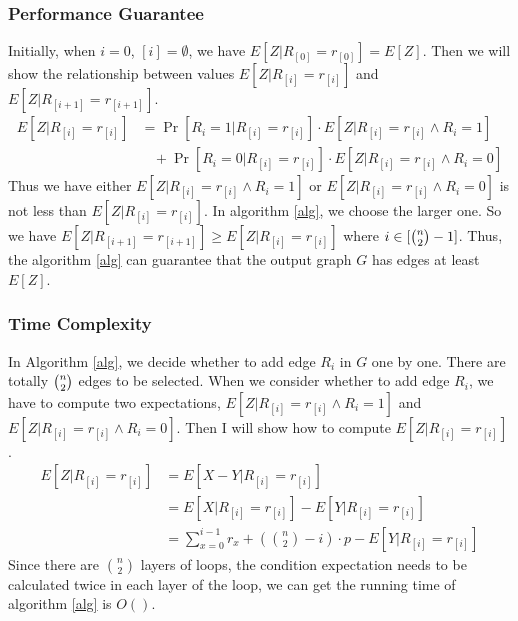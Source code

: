 \subsubsection{Performance Guarantee}

Initially, when $i=0$, $[i]=\emptyset$, we have $E[Z|R_{[0]}=r_{[0]}]=E[Z]$.
Then we will show the relationship between values $E[Z|R_{[i]}=r_{[i]}]$ and  $E[Z|R_{[i+1]}=r_{[i+1]}]$. 
\begin{align}
    \nonumber E[Z|R_{[i]}=r_{[i]}]&=\Pr[R_i=1|R_{[i]}=r_{[i]}]\cdot E[Z|R_{[i]}=r_{[i]}\wedge R_i=1]\\
    \nonumber &~~~~+\Pr[R_i=0|R_{[i]}=r_{[i]}]\cdot E[Z|R_{[i]}=r_{[i]}\wedge R_i=0]
\end{align}
Thus we have either $E[Z|R_{[i]}=r_{[i]}\wedge R_i=1]$ or $E[Z|R_{[i]}=r_{[i]}\wedge R_i=0]$ is not less than  $E[Z|R_{[i]}=r_{[i]}] $. In algorithm \ref{alg}, we choose the larger one. So we have $E[Z|R_{[i+1]}=r_{[i+1]}] \ge E[Z|R_{[i]}=r_{[i]}]$ where $i\in [\tbinom{n}{2}-1]$.
Thus, the algorithm \ref{alg} can guarantee that the output graph $G$ has edges at least $E[Z]$.
\subsubsection{Time Complexity }
In Algorithm \ref{alg}, we decide whether to add edge $R_i$ in $G$ one by one. There are totally $\tbinom{n}{2}$ edges to be selected.
When we consider whether to add edge $R_i$, we have to compute two expectations, $E[Z|R_{[i]}=r_{[i]}\wedge R_i=1]$ and $E[Z|R_{[i]}=r_{[i]}\wedge R_i=0]$. Then I will show how to compute $E[Z|R_{[i]}=r_{[i]}]$.
\begin{align}
    \nonumber E[Z|R_{[i]}=r_{[i]}]&=E[X-Y|R_{[i]}=r_{[i]}]\\
    \nonumber &=E[X|R_{[i]}=r_{[i]}]-E[Y|R_{[i]}=r_{[i]}]\\
    \nonumber &=\sum_{x=0}^{i-1}r_x + (\binom{n}{2}-i)\cdot p -E[Y|R_{[i]}=r_{[i]}]
\end{align}
Since there are $\binom{n}{2}$ layers of loops, the condition expectation needs to be calculated twice in each layer of the loop, we can get the running time of algorithm \ref{alg} is $O()$.
